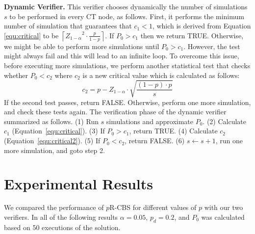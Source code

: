 \documentclass[letterpaper]{article} %
\newcommand{\prcbs}{$p$R-CBS\xspace}
\begin{document}
{\bf Dynamic Verifier.} 
This verifier chooses dynamically the number of simulations $s$ to be performed in every CT node, as follows.  First, it performs the minimum number of simulation that guarantees that $c_1<1$, which is derived from Equation \ref{equ:critical} to be ${  \left \lceil {Z_{1-\alpha}}^2 \cdot \frac{p}{1-p} \right \rceil}$. 
If $P_0>c_1$ then we return TRUE. Otherwise, we might be able to perform more simulations until $P_0>c_1$. However, the test might always fail and this will lead to an infinite loop.  To overcome this issue, before executing more simulations, we perform another statistical test that checks whether $P_0<c_2$ where $c_2$ is a new critical value which is calculated as follows:
\begin{equation}
{  c_2=p-Z_{1-\alpha} \cdot \sqrt{\frac{(1-p) \cdot p}{s}}}
\label{equ:critical2}
\end{equation}
If the second test passes, return FALSE. Otherwise, perform one more simulation, and check these tests again. The verification phase of the dynamic verifier summarized as follows. (1) Run $s$ simulations and approximate $P_0$. (2) Calculate $c_1$  (Equation~\ref{equ:critical}). (3) If $P_0>c_1$, return TRUE. (4) Calculate $c_2$ (Equation~\ref{equ:critical2}). (5) If $P_0<c_2$, return FALSE. (6) $s \gets s+1$, run one more simulation, and goto step 2.


\section{Experimental Results}
\label{sec:experiments1}

We compared the performance of \prcbs{} for different values of $p$ with our two verifiers. In all of the following results $\alpha=0.05$, $p_d=0.2$, and $P_0$ was calculated based on 50 executions of the solution. 
\end{document}
